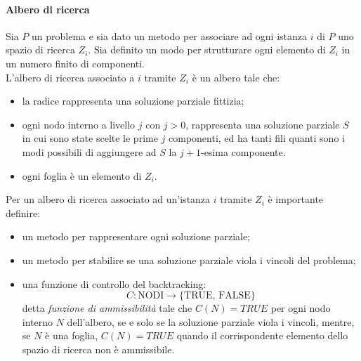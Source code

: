\documentclass[12pt]{report}
\begin{document}
 	\paragraph{Albero di ricerca} Sia $P$ un problema e sia dato un metodo per associare ad ogni istanza $i$ di $P$ uno spazio di ricerca $Z_i$. Sia definito un modo per strutturare ogni elemento di $Z_i$ in un numero finito di componenti. \\
 	L'albero di ricerca associato a $i$ tramite $Z_i$ è un albero tale che:
 	\begin{itemize}
 		\item la radice rappresenta una soluzione parziale fittizia;
 		\item ogni nodo interno a livello $j$ con $j > 0$, rappresenta una soluzione parziale $S$ in cui sono state scelte le prime $j$ componenti, ed ha tanti fili quanti sono i modi possibili di aggiungere ad $S$ la $j+1$-esima componente.
 		\item ogni foglia è un elemento di $Z_i$.
 	\end{itemize}
 	Per un albero di ricerca associato ad un'istanza $i$ tramite $Z_i$ è importante definire:
 	\begin{itemize}
 		\item un metodo per rappresentare ogni soluzione parziale;
 		\item un metodo per stabilire se una soluzione parziale viola i vincoli del problema;
 		\item una funzione di controllo del backtracking:
 		\[
 		C: \text{NODI} \to \{\text{TRUE, FALSE}\}
 		\]
 		detta \textit{funzione di ammissibilità} tale che $C(N) = TRUE$ per ogni nodo interno $N$ dell'albero, se e solo se la soluzione parziale viola i vincoli, mentre, se $N$ è una foglia, $C(N) = TRUE$ quando il corrispondente elemento dello spazio di ricerca non è ammissibile.
 	\end{itemize}
\end{document}
